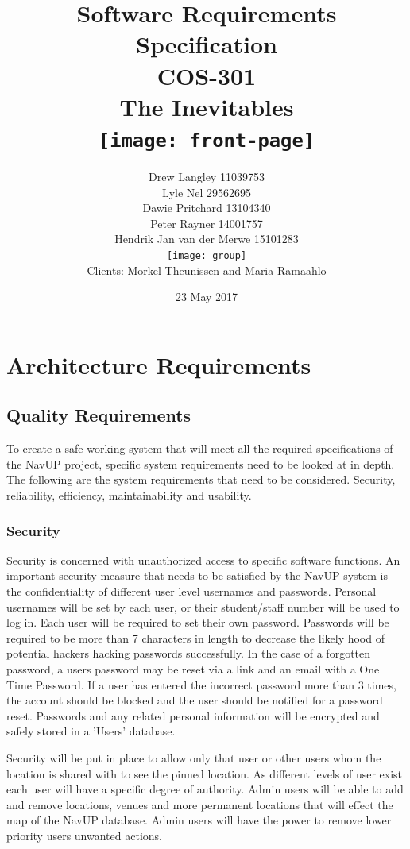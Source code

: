\documentclass{article}
\title{ Software Requirements Specification \\ COS-301 \\ The Inevitables \\[0.5cm] \texttt{[image: front-page]}}
\author{Drew Langley \hfill 11039753 \\ Lyle Nel \hfill 29562695 \\ Dawie Pritchard \hfill 13104340 \\  Peter Rayner \hfill 14001757\\ Hendrik Jan van der Merwe \hfill 15101283 \\ [1cm]\texttt{[image: group]}\\ [1cm] Clients: Morkel Theunissen and Maria Ramaahlo }
\date{23 May 2017}
\begin{document}
\maketitle
\pagebreak
\tableofcontents
\pagebreak


\newpage
	\section{Architecture Requirements}
		\subsection{Quality Requirements}
		 To create a safe working system that will meet all the required specifications of the NavUP project, specific system requirements need to be looked at in depth. The following are the system requirements that need to be considered. Security, reliability, efficiency, maintainability and usability.
		 
		 \subsubsection{Security}
		 Security is concerned with unauthorized access to specific software functions. An important security measure that needs to be satisfied by the NavUP system is the confidentiality of different user level usernames and passwords. Personal usernames will be set by each user, or their student/staff number will be used to log in. Each user will be required to set their own password. Passwords will be required to be more than 7 characters in length to decrease the likely hood of potential hackers hacking passwords successfully. In the case of a forgotten password, a users password may be reset via a link and an email with a One Time Password. If a user has entered the incorrect password more than 3 times, the account should be blocked and the user should be notified for a password reset. Passwords and any related personal information will be encrypted and safely stored in a 'Users' database.
		 
	Security will be put in place to allow only that user or other users whom the location is shared with to see the pinned location. As different levels of user exist each user will have a specific degree of authority. Admin users will be able to add and remove locations, venues and more permanent locations that will effect the map of the NavUP database. Admin users will have the power to remove lower priority users unwanted actions.
		 
\end{document}
